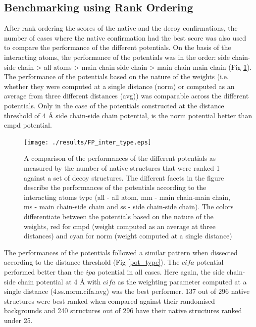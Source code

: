 \vfill

\subsection{Benchmarking using Rank Ordering}
After rank ordering the scores of the native and the decoy confirmations, the number of cases where the native confirmation had the best score was also used to compare the performance of the different potentials. On the basis of the interacting atoms, the performance of the potentials was in the order: side chain-side chain > all atoms > main chain-side chain > main chain-main chain (Fig \ref{inter_type}). The performance of the potentials based on the nature of the weights (i.e. whether they were computed at a single distance (norm) or computed as an average from three different distances (avg)) was comparable across the different potentials. Only in the case of the potentials constructed at the distance threshold of 4 \AA \; side chain-side chain potential, is the norm potential better than cmpd potential.

\begin{figure}[ht]
	\centering
	\texttt{[image: ./results/FP\_inter\_type.eps]}
	\caption[Pairwise potential performance based on interacting atom types]{A comparison of the performances of the different potentials as measured by the number of native structures that were ranked 1 against a set of decoy structures. The different facets in the figure describe the performances of the potentials according to the interacting atoms type (all - all atom, mm - main chain-main chain, ms - main chain-side chain and ss - side chain-side chain). The colors differentiate between the potentials based on the nature of the weights, red for cmpd (weight computed as an average at three distances) and cyan for norm (weight computed at a single distance)}
	\label{inter_type}
\end{figure}

The performances of the potentials followed a similar pattern when dissected according to  the distance threshold (Fig \ref{pot_type}). The $cifa$ potential performed better than the $ipa$ potential in all cases. Here again, the side chain-side chain potential at 4 \AA \; with $cifa$ as the weighting parameter computed at a single distance (4.ss.norm.cifa.avg) was the best performer. 137 out of 296 native structures were best ranked when compared against their randomised backgrounds and 240 structures out of 296 have their native structures ranked under 25.

